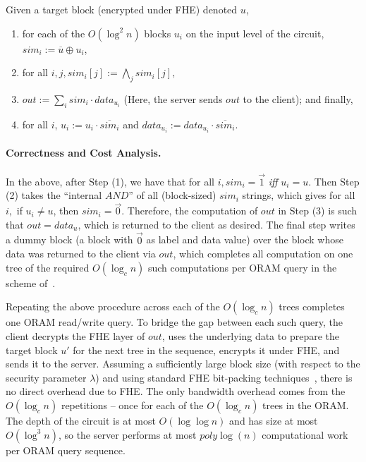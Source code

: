 {Given a target block (encrypted under FHE) denoted $u$,
\begin{enumerate}
\item for each of the $O(\log^2 n)$ blocks $u_i$ on the input level of the circuit, $sim_i := \overline{u}\oplus u_i$,
\item for all $i, j, sim_i[j] := \bigwedge_j sim_i[j],$
\item $out := \sum_i sim_i\cdot data_{u_i}$ (Here, the server sends $out$ to the client); and finally,
\item for all $i$, $u_i := u_i\cdot\overline{sim_i}$ and $data_{u_i} := data_{u_i}\cdot\overline{sim_i}$.
\end{enumerate}

\paragraph{Correctness and Cost Analysis.} 

In the above, after Step (1), we have that for all $i, sim_i = \vec{1}$ \emph{iff} $u_i = u$. Then Step (2) takes the ``internal $AND$'' of all (block-sized) $sim_i$ strings, which gives for all $i,$ if $u_i\ne u$, then $sim_i = \vec{0}$. Therefore, the computation of $out$ in Step (3) is such that $out = data_u$, which is returned to the client as desired. The final step writes a dummy block (a block with $\vec{0}$ as label and data value) over the block whose data was returned to the client via $out$, which completes all computation on one tree of the required $O(\log_c n)$ such computations per ORAM query in the scheme of~\cite{SCSL11}.

Repeating the above procedure across each of the $O(\log_c n)$ trees completes one ORAM read/write query. To bridge the gap between each such query, the client decrypts the FHE layer of $out$, uses the underlying data to prepare the target block $u'$ for the next tree in the sequence, encrypts it under FHE, and sends it to the server. Assuming a sufficiently large block size (with respect to the security parameter $\lambda$) and using standard FHE bit-packing techniques~\cite{BGV11}, there is no direct overhead due to FHE. The only bandwidth overhead comes from the $O(\log_c n)$ repetitions -- once for each of the $O(\log_c n)$ trees in the ORAM. The depth of the circuit is at most $O(\log\log n)$ and has size at most $O(\log^3 n)$, so the server performs at most $poly\log(n)$ computational work per ORAM query sequence.
}

